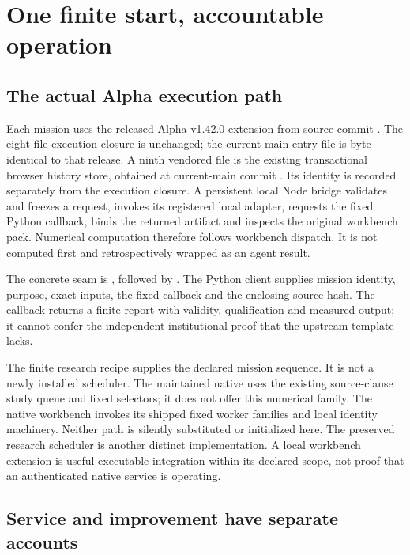 \section{One finite start, accountable operation}
\label{sec:operations}

\subsection{The actual Alpha execution path}

Each mission uses the released Alpha v1.42.0  extension from source commit
 \citep{alphaWorkbench1420}.
The eight-file execution closure is unchanged; the current-main entry file is byte-identical to that release.
A ninth vendored file is the existing transactional browser history store, obtained at current-main commit
. Its identity is recorded separately from the execution
closure. A persistent local Node bridge validates and freezes a request, invokes its registered local adapter, requests the
fixed Python callback, binds the returned artifact and inspects the original workbench pack. Numerical
computation therefore follows workbench dispatch. It is not computed first and retrospectively wrapped as
an agent result.

The concrete seam is , followed by
. The Python client supplies mission identity, purpose, exact inputs, the fixed
callback and the enclosing source hash. The callback returns a finite report with validity, qualification
and measured output; it cannot confer the independent institutional proof that the upstream template lacks.

The finite research recipe supplies the declared mission sequence. It is not a newly installed scheduler.
The maintained native  uses the existing source-clause study queue and fixed
selectors; it does not offer this numerical family. The native workbench invokes its shipped fixed worker
families and local identity machinery. Neither path is silently substituted or initialized here. The preserved
research scheduler is another distinct implementation. A local workbench extension is useful executable
integration within its declared scope, not proof that an authenticated native service is operating.

\subsection{Service and improvement have separate accounts}

